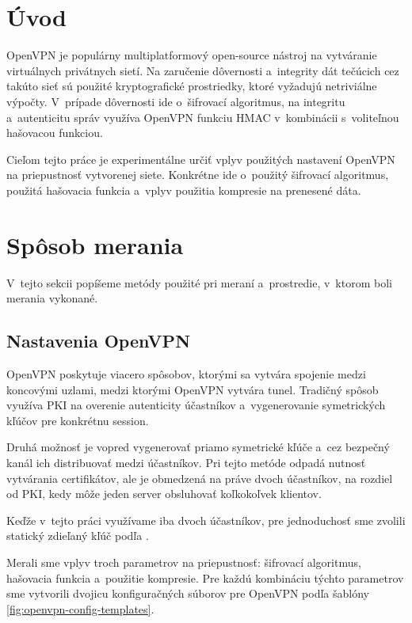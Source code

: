 \documentclass[12pt,a4paper]{article}
\begin{document}
\section{Úvod}

OpenVPN \cite{openvpn} je populárny multiplatformový open-source nástroj
na vytváranie virtuálnych privátnych sietí. Na zaručenie dôvernosti
a~integrity dát tečúcich cez takúto sieť sú použité kryptografické
prostriedky, ktoré vyžadujú netriviálne výpočty. V~prípade dôvernosti ide
o~šifrovací algoritmus, na integritu a~autenticitu správ využíva OpenVPN
funkciu HMAC v~kombinácii s~voliteľnou hašovacou funkciou.

Cieľom tejto práce je experimentálne určiť vplyv použitých nastavení
OpenVPN na priepustnosť vytvorenej siete. Konkrétne ide o~použitý
šifrovací algoritmus, použitá hašovacia funkcia a~vplyv použitia kompresie
na prenesené dáta.

\section{Spôsob merania}

V~tejto sekcii popíšeme metódy použité pri meraní a~prostredie, v~ktorom
boli merania vykonané.

\subsection{Nastavenia OpenVPN}

OpenVPN poskytuje viacero spôsobov, ktorými sa vytvára spojenie medzi
koncovými uzlami, medzi ktorými OpenVPN vytvára tunel. Tradičný spôsob
využíva PKI na overenie autenticity účastníkov a~vygenerovanie
symetrických kľúčov pre konkrétnu session.

Druhá možnosť je vopred vygenerovať priamo symetrické kľúče a~cez bezpečný
kanál ich distribuovať medzi účastníkov. Pri tejto metóde odpadá nutnosť
vytvárania certifikátov, ale je obmedzená na práve dvoch účastníkov, na
rozdiel od PKI, kedy môže jeden server obsluhovať koľkokoľvek klientov.

Keďže v~tejto práci využívame iba dvoch účastníkov, pre jednoduchosť sme
zvolili statický zdieľaný kľúč podľa \cite{openvpn-static}.

Merali sme vplyv troch parametrov na priepustnosť: šifrovací algoritmus,
hašovacia funkcia a~použitie kompresie. Pre každú kombináciu týchto
parametrov sme vytvorili dvojicu konfiguračných súborov pre OpenVPN podľa
šablóny \ref{fig:openvpn-config-templates}.
\end{document}
